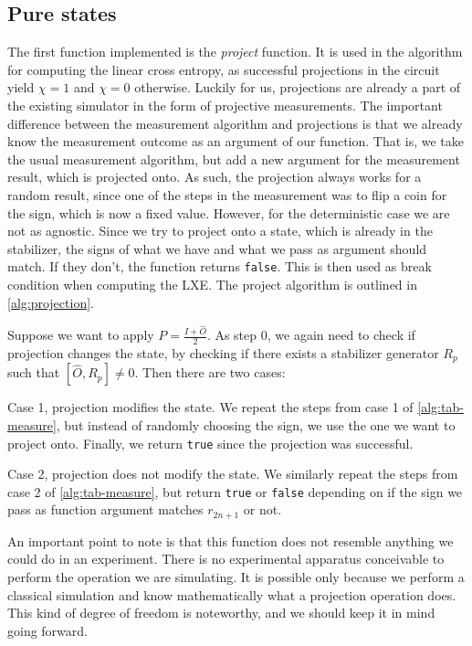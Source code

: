 \subsection{Pure states}
The first function implemented is the \emph{project} function. It is used in
the algorithm for computing the linear cross entropy, as successful projections
in the circuit yield $\chi = 1$ and $\chi = 0$ otherwise. Luckily for us,
projections are already a part of the existing simulator in the form of
projective measurements. The important difference between the measurement
algorithm and projections is that we already know the measurement outcome as an
argument of our function. That is, we take the usual measurement algorithm, but
add a new argument for the measurement result, which is projected onto. As
such, the projection always works for a random result, since one of the steps
in the measurement was to flip a coin for the sign, which is now a fixed value.
However, for the deterministic case we are not as agnostic. Since we try to
project onto a state, which is already in the stabilizer, the signs of what we
have and what we pass as argument should match. If they don't, the function
returns \verb|false|. This is then used as break condition when computing the
LXE. The project algorithm is outlined in
\cref{alg:projection}.
\begin{alg}\label{alg:projection}
  Suppose we want to apply $P = \frac{I + \hat{O}}{2}$. As step 0, we again
  need to check if projection changes the state,
   by checking if there exists a stabilizer generator $R_p$
  such that $[\hat{O},R_p]\neq 0$. Then there are two cases:

  Case 1, projection modifies the state. We repeat the steps from case 1 of
  \cref{alg:tab-measure}, but instead of randomly choosing the sign, we use the
  one we want to project onto. Finally, we return \verb|true| since the
  projection was successful.

  Case 2, projection does not modify the state. We similarly repeat the steps
  from case 2 of \cref{alg:tab-measure}, but return \verb|true| or \verb|false|
  depending on if the sign we pass as function argument matches $r_{2n+1}$ or
  not.
\end{alg}
An important point to note is that this function does not resemble anything we
could do in an experiment. There is no experimental apparatus conceivable to
perform the operation we are simulating. It is possible only because we
perform a classical simulation and know mathematically what a projection
operation does. This kind of degree of freedom is noteworthy, and we should
keep it in mind going forward.

